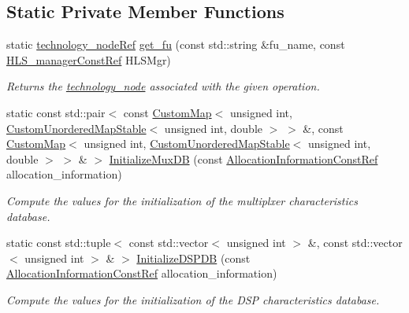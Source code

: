 \subsection*{Static Private Member Functions}
\begin{DoxyCompactItemize}
\item 
static \hyperlink{technology__node_8hpp_a33dd193b7bd6b987bf0d8a770a819fa7}{technology\+\_\+node\+Ref} \hyperlink{classAllocationInformation_a787dc8988eb46815a0ef63bc0457cfda}{get\+\_\+fu} (const std\+::string \&fu\+\_\+name, const \hyperlink{hls__manager_8hpp_a1b481383e3beabc89bd7562ae672dd8c}{H\+L\+S\+\_\+manager\+Const\+Ref} H\+L\+S\+Mgr)
\begin{DoxyCompactList}\small\item\em Returns the \hyperlink{structtechnology__node}{technology\+\_\+node} associated with the given operation. \end{DoxyCompactList}\item 
static const std\+::pair$<$ const \hyperlink{custom__map_8hpp_a18ca01763abbe3e5623223bfe5aaac6b}{Custom\+Map}$<$ unsigned int, \hyperlink{custom__map_8hpp_a7314a7df1cdb3a3acf478ab86e95c226}{Custom\+Unordered\+Map\+Stable}$<$ unsigned int, double $>$ $>$ \&, const \hyperlink{custom__map_8hpp_a18ca01763abbe3e5623223bfe5aaac6b}{Custom\+Map}$<$ unsigned int, \hyperlink{custom__map_8hpp_a7314a7df1cdb3a3acf478ab86e95c226}{Custom\+Unordered\+Map\+Stable}$<$ unsigned int, double $>$ $>$ \& $>$ \hyperlink{classAllocationInformation_ad396c6ab4099e242cdf8411c932fd859}{Initialize\+Mux\+DB} (const \hyperlink{allocation__information_8hpp_a54287618a63bf87e31ddb17ba01e7ca7}{Allocation\+Information\+Const\+Ref} allocation\+\_\+information)
\begin{DoxyCompactList}\small\item\em Compute the values for the initialization of the multiplxer characteristics database. \end{DoxyCompactList}\item 
static const std\+::tuple$<$ const std\+::vector$<$ unsigned int $>$ \&, const std\+::vector$<$ unsigned int $>$ \& $>$ \hyperlink{classAllocationInformation_a5eef44ab205d172b0d5e47a5d55acbd7}{Initialize\+D\+S\+P\+DB} (const \hyperlink{allocation__information_8hpp_a54287618a63bf87e31ddb17ba01e7ca7}{Allocation\+Information\+Const\+Ref} allocation\+\_\+information)
\begin{DoxyCompactList}\small\item\em Compute the values for the initialization of the D\+SP characteristics database. \end{DoxyCompactList}\end{DoxyCompactItemize}
